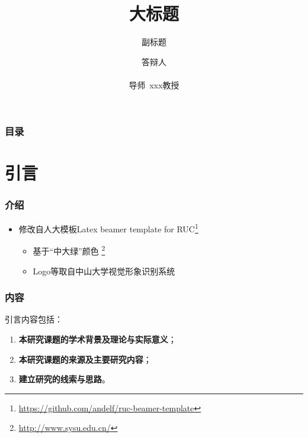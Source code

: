 \documentclass[AutoFakeBold,AutoFakeSlant]{beamer}
\title[中山大学硕士学位论文答辩]{
  大标题}
\subtitle{副标题}
\institute[Sun Yat-Sen University]{
  XX学院 \\ 
  中山大学}
\date[\today]{\ctoday}
\begin{document}
\newtheorem{assumption}{假设}

\author[Author Name]{
  答辩人 
  \texorpdfstring{\\}{}
  \texorpdfstring{\\ {\small 导师~xxx教授}}{}
}

\begin{frame}
  \titlepage
\end{frame}
\setcounter{framenumber}{0}

\begin{frame}
  \frametitle{目\quad 录}
  \tableofcontents[hideallsubsections]
\end{frame}

\section{引言}

\begin{frame}
  \frametitle{介绍}

  \begin{itemize}
    \item 修改自人大模板Latex beamer template for RUC\footnote{\url{https://github.com/andelf/ruc-beamer-template}}
    \begin{itemize}
      \item 基于“\textcolor{sysugreen}{中大绿}”颜色 \footnote{\url{http://www.sysu.edu.cn/}}
      \item Logo等取自中山大学视觉形象识别系统
    \end{itemize}
  \end{itemize}
\end{frame}

\begin{frame}
  \frametitle{内容}

  引言内容包括：
  \begin{enumerate}
    \item \textbf{本研究课题的学术背景及理论与实际意义}；
    \item \textbf{本研究课题的来源及主要研究内容}；
    \item \textbf{建立研究的线索与思路}。
  \end{enumerate}

\end{frame}
\end{document}
